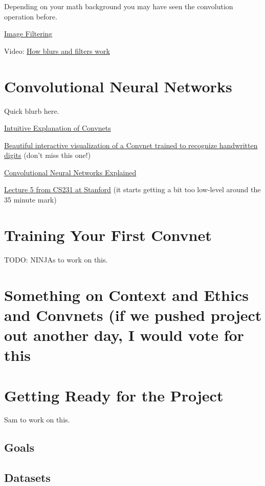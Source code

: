 \documentclass[assignment07_Solutions]{subfiles}
\begin{document}
Depending on your math background you may have seen the convolution operation before.

\begin{externalresources}[(30 minutes)]
\bi
\item \href{http://machinelearninguru.com/computer_vision/basics/convolution/image_convolution_1.html}{Image Filtering}
\item Video: \href{https://www.youtube.com/watch?v=C_zFhWdM4ic}{How blurs and filters work}
\ei
\end{externalresources}

\section{Convolutional Neural Networks}
Quick blurb here.
\begin{externalresources}[(60 minutes)]
\bi
\item \href{https://ujjwalkarn.me/2016/08/11/intuitive-explanation-convnets/}{Intuitive Explanation of Convnets}
\item \href{http://scs.ryerson.ca/~aharley/vis/conv/flat.html}{Beautiful interactive visualization of a Convnet trained to recognize handwritten digits} (don't miss this one!)
\item \href{https://www.datascience.com/blog/convolutional-neural-network}{Convolutional Neural Networks Explained}
\item \href{https://www.youtube.com/watch?v=bNb2fEVKeEo&list=PL3FW7Lu3i5JvHM8ljYj-zLfQRF3EO8sYv\&index=5}{Lecture 5 from CS231 at Stanford} (it starts getting a bit too low-level around the 35 minute mark)
\ei
\end{externalresources}

\section{Training Your First Convnet}

TODO: NINJAs to work on this.

\section{Something on Context and Ethics and Convnets (if we pushed project out another day, I would vote for this}

\section{Getting Ready for the Project}
Sam to work on this.
\subsection{Goals}
\subsection{Datasets}
\end{document}
